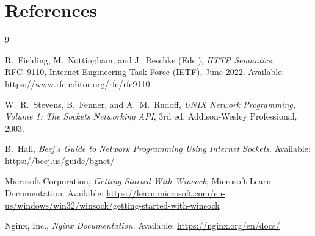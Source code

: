 \documentclass[11pt,a4paper]{article}
\begin{document}
\section{References}
\begin{thebibliography}{9}

R.~Fielding, M.~Nottingham, and J.~Reschke (Eds.), \emph{HTTP Semantics},
RFC~9110, Internet Engineering Task Force (IETF), June 2022.
Available: \url{https://www.rfc-editor.org/rfc/rfc9110}

W.~R.~Stevens, B.~Fenner, and A.~M.~Rudoff, \emph{UNIX Network Programming,
Volume 1: The Sockets Networking API}, 3rd ed. Addison-Wesley Professional,
2003.

B.~Hall, \emph{Beej's Guide to Network Programming Using Internet Sockets}.
Available: \url{https://beej.us/guide/bgnet/}

Microsoft Corporation, \emph{Getting Started With Winsock}, Microsoft Learn
Documentation. Available: \url{https://learn.microsoft.com/en-us/windows/win32/winsock/getting-started-with-winsock}

Nginx, Inc., \emph{Nginx Documentation}. Available: \url{https://nginx.org/en/docs/}

\end{thebibliography}
\end{document}
